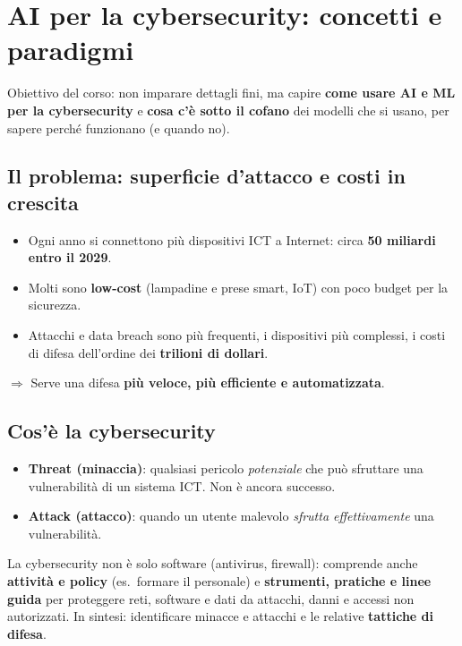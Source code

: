 \chapter{AI per la cybersecurity: concetti e paradigmi}
\label{cap:ai-cyber}

Obiettivo del corso: non imparare dettagli fini, ma capire \textbf{come usare AI e ML per la
cybersecurity} e \textbf{cosa c'è sotto il cofano} dei modelli che si usano, per sapere perché
funzionano (e quando no).

\section{Il problema: superficie d'attacco e costi in crescita}
\begin{itemize}
  \item Ogni anno si connettono più dispositivi ICT a Internet: circa \textbf{50 miliardi entro il 2029}.
  \item Molti sono \textbf{low-cost} (lampadine e prese smart, IoT) con poco budget per la sicurezza.
  \item Attacchi e data breach sono più frequenti, i dispositivi più complessi, i costi di difesa
        dell'ordine dei \textbf{trilioni di dollari}.
\end{itemize}
$\Rightarrow$ Serve una difesa \textbf{più veloce, più efficiente e automatizzata}.

\section{Cos'è la cybersecurity}
\begin{definizione}
\begin{itemize}
  \item \textbf{Threat (minaccia)}: qualsiasi pericolo \emph{potenziale} che può sfruttare una vulnerabilità di un sistema ICT. Non è ancora successo.
  \item \textbf{Attack (attacco)}: quando un utente malevolo \emph{sfrutta effettivamente} una vulnerabilità.
\end{itemize}
\end{definizione}

La cybersecurity non è solo software (antivirus, firewall): comprende anche \textbf{attività e
policy} (es.\ formare il personale) e \textbf{strumenti, pratiche e linee guida} per proteggere
reti, software e dati da attacchi, danni e accessi non autorizzati. In sintesi: identificare
minacce e attacchi e le relative \textbf{tattiche di difesa}.

